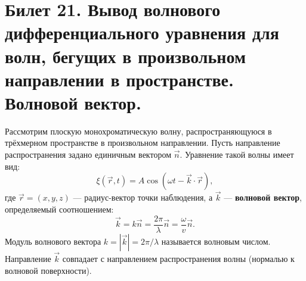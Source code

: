 \section{Билет 21. Вывод волнового дифференциального уравнения для волн, бегущих в произвольном направлении в пространстве. Волновой вектор.}

\begin{definition}
Рассмотрим плоскую монохроматическую волну, распространяющуюся в трёхмерном пространстве в произвольном направлении. Пусть направление распространения задано единичным вектором $\vec{n}$. Уравнение такой волны имеет вид:
\begin{equation}
    \xi(\vec{r}, t) = A \cos(\omega t - \vec{k} \cdot \vec{r}), \label{eq:3d_wave_21}
\end{equation}
где $\vec{r} = (x, y, z)$ --- радиус-вектор точки наблюдения, а $\vec{k}$ --- \textbf{волновой вектор}, определяемый соотношением:
\begin{equation}
    \vec{k} = k \vec{n} = \frac{2\pi}{\lambda} \vec{n} = \frac{\omega}{v} \vec{n}.
\end{equation}
Модуль волнового вектора $k = |\vec{k}| = 2\pi/\lambda$ называется волновым числом. Направление $\vec{k}$ совпадает с направлением распространения волны (нормалью к волновой поверхности).
\end{definition}

